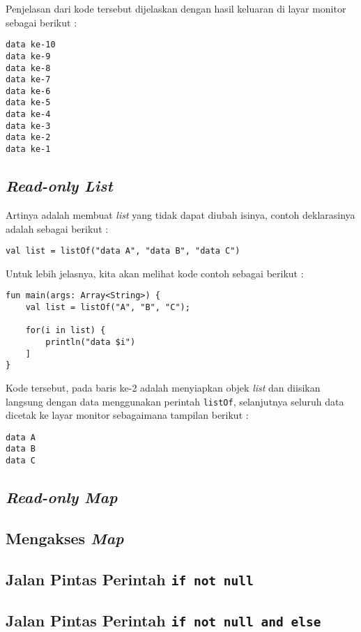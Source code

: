Penjelasan dari kode tersebut dijelaskan dengan hasil keluaran di layar monitor sebagai berikut :

\begin{lstlisting}
data ke-10
data ke-9
data ke-8
data ke-7
data ke-6
data ke-5
data ke-4
data ke-3
data ke-2
data ke-1
\end{lstlisting}

\subsection{\textit{Read-only List}}

Artinya adalah membuat \textit{list} yang tidak dapat diubah isinya, contoh deklarasinya adalah sebagai berikut :

\begin{lstlisting}
val list = listOf("data A", "data B", "data C")
\end{lstlisting}

Untuk lebih jelasnya, kita akan melihat kode contoh sebagai berikut :

\begin{lstlisting}
fun main(args: Array<String>) {
	val list = listOf("A", "B", "C");
	
	for(i in list) {
		println("data $i")	
	]
}
\end{lstlisting}

Kode tersebut, pada baris ke-2 adalah menyiapkan objek \textit{list} dan diisikan langsung dengan data menggunakan perintah \texttt{listOf}, selanjutnya seluruh data dicetak ke layar monitor sebagaimana tampilan berikut :

\begin{lstlisting}
data A
data B
data C
\end{lstlisting}

\subsection{\textit{Read-only Map}}
\subsection{Mengakses \textit{Map}}
\subsection{Jalan Pintas Perintah \texttt{if not null}}
\subsection{Jalan Pintas Perintah \texttt{if not null and else}}
